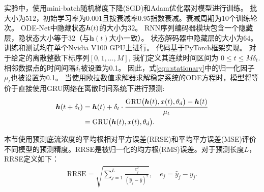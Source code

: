 实验中，使用mini-batch随机梯度下降(SGD)和Adam优化器\cite{kingma2014adam}对模型进行训练。
批大小为$512$，初始学习率为$0.001$且按衰减率$0.95$指数衰减。衰减周期为10个训练轮次。
ODE-Net中隐藏状态$\boldsymbol h(t)$的大小为$32$。
RNN序列编码器模块包含一个隐藏层，隐状态大小等于$32$（与$\boldsymbol h(t)$大小一致）。
状态解码器中隐藏层的大小为$64$。
训练和测试均在单个Nvidia V100 GPU上进行。
代码基于PyTorch框架实现。
对于给定的离散整数下标序列$[0,1,\dots, M]$, 我们定义其连续时间区间为 $0\leq t\leq M\delta_t$.
相邻数据点的时间间隔$\delta _t$被设置为0.1。
因此，式\eqref{equ:stationary}中的归一化因子$\mu _t$也被设置为0.1。
当使用欧拉数值求解器求解稳定系统的ODE方程时，模型将等价于直接使用GRU网络在离散时间系统下进行预测:
\begin{align}
    \boldsymbol h(t+\delta _t) &=\boldsymbol h(t) + \delta _t \cdot \frac{\text{GRU}\big(\boldsymbol h(t),x(t), \theta_d \big) - \boldsymbol h(t)}{\mu _t}  \nonumber\\
                      &= \text{GRU}\big(\boldsymbol h(t),x(t), \theta _d\big).
\end{align}

本节使用预测底流浓度的平均根相对平方误差(RRSE)和平均平方误差(MSE)评价不同模型的预测精度。RRSE是被归一化的均方根(RMS)误差。对于预测长度$L$，RRSE定义如下：
\begin{equation}
\begin{aligned}
    \text{RRSE}=\sqrt{\sum_{j=1}^{L} \frac{e_{j}^{2}}{\left(\hat{y}_{j}-\bar{y}\right)^{2}}}, \quad e_{j}=\hat{y}_{j}-y_{j}.
\end{aligned}
\label{equ:rrse}
\end{equation}




